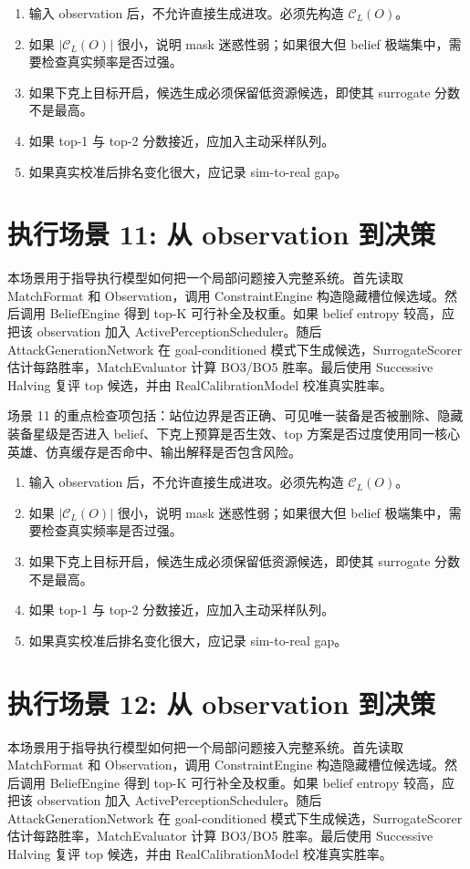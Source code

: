 \documentclass[UTF8,12pt,openany]{ctexbook}
\newcommand{\Ccal}{\mathcal{C}}
\begin{document}
\begin{enumerate}[leftmargin=2em]
\item 输入 observation 后，不允许直接生成进攻。必须先构造 $\Ccal_L(O)$。
\item 如果 $|\Ccal_L(O)|$ 很小，说明 mask 迷惑性弱；如果很大但 belief 极端集中，需要检查真实频率是否过强。
\item 如果下克上目标开启，候选生成必须保留低资源候选，即使其 surrogate 分数不是最高。
\item 如果 top-1 与 top-2 分数接近，应加入主动采样队列。
\item 如果真实校准后排名变化很大，应记录 sim-to-real gap。
\end{enumerate}


\section{执行场景 11: 从 observation 到决策}
本场景用于指导执行模型如何把一个局部问题接入完整系统。首先读取 MatchFormat 和 Observation，调用 ConstraintEngine 构造隐藏槽位候选域。然后调用 BeliefEngine 得到 top-K 可行补全及权重。如果 belief entropy 较高，应把该 observation 加入 ActivePerceptionScheduler。随后 AttackGenerationNetwork 在 goal-conditioned 模式下生成候选，SurrogateScorer 估计每路胜率，MatchEvaluator 计算 BO3/BO5 胜率。最后使用 Successive Halving 复评 top 候选，并由 RealCalibrationModel 校准真实胜率。

场景 11 的重点检查项包括：站位边界是否正确、可见唯一装备是否被删除、隐藏装备星级是否进入 belief、下克上预算是否生效、top 方案是否过度使用同一核心英雄、仿真缓存是否命中、输出解释是否包含风险。

\begin{enumerate}[leftmargin=2em]
\item 输入 observation 后，不允许直接生成进攻。必须先构造 $\Ccal_L(O)$。
\item 如果 $|\Ccal_L(O)|$ 很小，说明 mask 迷惑性弱；如果很大但 belief 极端集中，需要检查真实频率是否过强。
\item 如果下克上目标开启，候选生成必须保留低资源候选，即使其 surrogate 分数不是最高。
\item 如果 top-1 与 top-2 分数接近，应加入主动采样队列。
\item 如果真实校准后排名变化很大，应记录 sim-to-real gap。
\end{enumerate}


\section{执行场景 12: 从 observation 到决策}
本场景用于指导执行模型如何把一个局部问题接入完整系统。首先读取 MatchFormat 和 Observation，调用 ConstraintEngine 构造隐藏槽位候选域。然后调用 BeliefEngine 得到 top-K 可行补全及权重。如果 belief entropy 较高，应把该 observation 加入 ActivePerceptionScheduler。随后 AttackGenerationNetwork 在 goal-conditioned 模式下生成候选，SurrogateScorer 估计每路胜率，MatchEvaluator 计算 BO3/BO5 胜率。最后使用 Successive Halving 复评 top 候选，并由 RealCalibrationModel 校准真实胜率。
\end{document}
